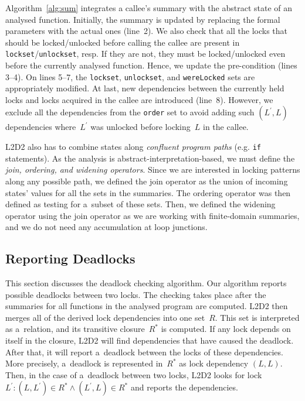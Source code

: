 \documentclass[runningheads]{llncs}
\newcommand{\LLDD}{\textsc{L2D2}\xspace} %
\begin{document}
Algorithm~\ref{alg:sum} integrates a callee's summary with the abstract
state of an analysed function. Initially, the summary is updated by
replacing the formal parameters with the actual ones (line~2). We also
check that all the locks that should be locked/unlocked before calling the
callee are present in \texttt{lockset}/\texttt{unlockset}, resp. If they
are not, they must be locked/unlocked even before the currently analysed
function. Hence, we update the pre-condition (lines 3--4). On lines 5--7,
the \texttt{lockset}, \texttt{unlockset}, and \texttt{wereLocked} sets are
appropriately modified. At last, new dependencies between the currently
held locks and locks acquired in the callee are introduced (line~8).
However, we exclude all the dependencies from the \texttt{order} set to
avoid adding such $ (L^\prime, L) $ dependencies where~$ L^\prime $ was
unlocked before locking~$ L $ in the callee.

\LLDD also has to combine states along \emph{confluent program paths}
(e.g. \texttt{if} statements). As the analysis is
abstract-interpretation-based, we must define the \emph{join, ordering,
and widening operators}. Since we are interested in locking patterns along
any possible path, we defined the join operator as the union of
incoming states' values for all the sets in the summaries. The ordering
operator was then defined as testing for a~subset of these sets. Then, we
defined the widening operator using the join operator as we are
working with finite-domain summaries, and we do not need any accumulation
at loop junctions.

\enlargethispage{4mm}

\vspace*{-4mm}\subsection{Reporting Deadlocks}\vspace*{-2mm}

This section discusses the deadlock checking algorithm. Our algorithm
reports possible deadlocks between two locks. The checking takes place
after the summaries for all functions in the analysed program are computed.
\LLDD then merges all of the derived lock dependencies into one set~$ R $.
This set is interpreted as a~relation, and its transitive closure~$ R^* $ is
computed. If any lock depends on itself in the closure, \LLDD will find
dependencies that have caused the deadlock. After that, it will report
a~deadlock between the locks of these dependencies. More precisely,
a~deadlock is represented in~$ R^* $ as lock dependency $ (L, L) $. Then,
in the case of a~deadlock between two locks, \LLDD looks for lock
$ L^\prime : (L, L^\prime) \in R^* \wedge (L^\prime, L) \in R^* $ and
reports the dependencies.
\end{document}
